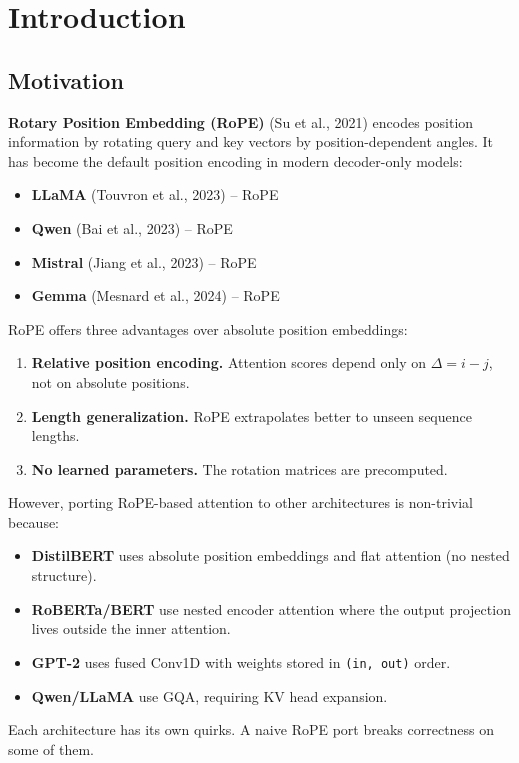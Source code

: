 
\section{Introduction}

\subsection{Motivation}

\textbf{Rotary Position Embedding (RoPE)} (Su et al., 2021) encodes position 
information by rotating query and key vectors by position-dependent angles. 
It has become the default position encoding in modern decoder-only models:

\begin{itemize}
\item \textbf{LLaMA} (Touvron et al., 2023) -- RoPE
\item \textbf{Qwen} (Bai et al., 2023) -- RoPE
\item \textbf{Mistral} (Jiang et al., 2023) -- RoPE
\item \textbf{Gemma} (Mesnard et al., 2024) -- RoPE

\end{itemize}
RoPE offers three advantages over absolute position embeddings:

\begin{enumerate}
\item \textbf{Relative position encoding.} Attention scores depend only on
  $\Delta = i - j$, not on absolute positions.
\item \textbf{Length generalization.} RoPE extrapolates better to unseen sequence
  lengths.
\item \textbf{No learned parameters.} The rotation matrices are precomputed.

\end{enumerate}
However, porting RoPE-based attention to other architectures is 
non-trivial because:

\begin{itemize}
\item \textbf{DistilBERT} uses absolute position embeddings and flat attention
  (no nested structure).
\item \textbf{RoBERTa/BERT} use nested encoder attention where the output
  projection lives outside the inner attention.
\item \textbf{GPT-2} uses fused Conv1D with weights stored in \texttt{(in, out)} order.
\item \textbf{Qwen/LLaMA} use GQA, requiring KV head expansion.

\end{itemize}
Each architecture has its own quirks. A naive RoPE port breaks correctness 
on some of them.

